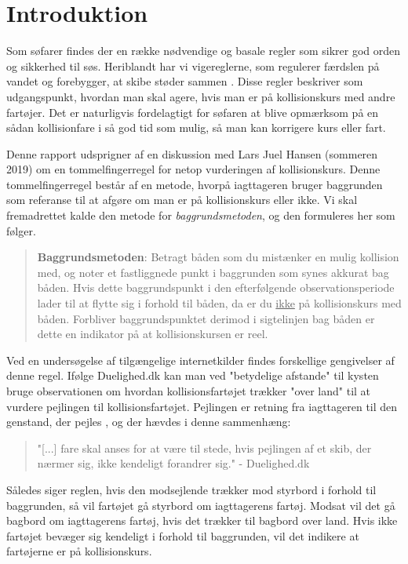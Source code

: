 \documentclass[%
 reprint,
nofootinbib,
aps,
]{revtex4-1}
\begin{document}
\section{Introduktion}
Som søfarer findes der en række nødvendige og basale regler som sikrer god orden og sikkerhed til søs. Heriblandt har vi vigereglerne, som regulerer færdslen på vandet og forebygger, at skibe støder sammen \cite{respektforvand}. Disse regler beskriver som udgangspunkt, hvordan man skal agere, hvis man er på kollisionskurs med andre fartøjer. Det er naturligvis fordelagtigt for søfaren at blive opmærksom på en sådan kollisionfare i så god tid som mulig, så man kan korrigere kurs eller fart. \par
Denne rapport udsprigner af en diskussion med Lars Juel Hansen (sommeren 2019) om en tommelfingerregel for netop vurderingen af kollisionskurs. Denne tommelfingerregel består af en metode, hvorpå iagttageren bruger baggrunden som referanse til at afgøre om man er på kollisionskurs eller ikke. Vi skal fremadrettet kalde den metode for \textit{baggrundsmetoden}, og den formuleres her som følger.
\begin{quote}
\textbf{Baggrundsmetoden}: Betragt båden som du mistænker en mulig kollision med, og noter et fastliggnede punkt i baggrunden som synes akkurat bag båden. Hvis dette baggrundspunkt i den efterfølgende observationsperiode lader til at flytte sig i forhold til båden, da er du \underline{ikke} på kollisionskurs med båden. Forbliver baggrundspunktet derimod i sigtelinjen bag båden er dette en indikator på at kollisionskursen er reel.
\end{quote}
Ved en undersøgelse af tilgængelige internetkilder findes forskellige gengivelser af denne regel. Ifølge Duelighed.dk \cite{duelighed} kan man ved "betydelige afstande" til kysten bruge observationen om hvordan kollisionsfartøjet trækker "over land" til at vurdere pejlingen til kollisionsfartøjet. Pejlingen er retning fra iagttageren til den genstand, der pejles \cite{ordbog}, og der hævdes i denne sammenhæng:
\begin{quote}
   "[...] fare skal anses for at være til stede, hvis pejlingen af et skib, der nærmer sig, ikke kendeligt forandrer sig." - Duelighed.dk \cite{duelighed}
\end{quote}
Således siger reglen, hvis den modsejlende trækker mod styrbord i forhold til baggrunden, så vil fartøjet gå styrbord om iagttagerens fartøj. Modsat vil det gå bagbord om iagttagerens fartøj, hvis det trækker til bagbord over land. Hvis ikke fartøjet bevæger sig kendeligt i forhold til baggrunden, vil det indikere at fartøjerne er på kollisionskurs. \par
\end{document}
